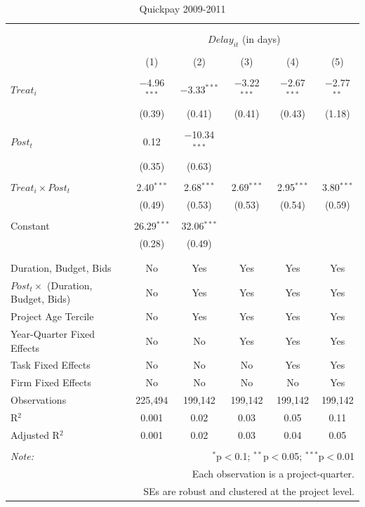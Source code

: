 \documentclass[]{article}
\begin{document}
\begin{table}[H] \centering 
  \caption{Quickpay 2009-2011} 
  \label{} 
\small 
\begin{tabular}{@{\extracolsep{-2pt}}lccccc} 
\\[-1.8ex]\hline 
\hline \\[-1.8ex] 
\\[-1.8ex] & \multicolumn{5}{c}{$Delay_{it}$ (in days)} \\ 
\\[-1.8ex] & (1) & (2) & (3) & (4) & (5)\\ 
\hline \\[-1.8ex] 
 $Treat_i$ & $-$4.96$^{***}$ & $-$3.33$^{***}$ & $-$3.22$^{***}$ & $-$2.67$^{***}$ & $-$2.77$^{**}$ \\ 
  & (0.39) & (0.41) & (0.41) & (0.43) & (1.18) \\ 
  & & & & & \\ 
 $Post_t$ & 0.12 & $-$10.34$^{***}$ &  &  &  \\ 
  & (0.35) & (0.63) &  &  &  \\ 
  & & & & & \\ 
 $Treat_i \times Post_t$ & 2.40$^{***}$ & 2.68$^{***}$ & 2.69$^{***}$ & 2.95$^{***}$ & 3.80$^{***}$ \\ 
  & (0.49) & (0.53) & (0.53) & (0.54) & (0.59) \\ 
  & & & & & \\ 
 Constant & 26.29$^{***}$ & 32.06$^{***}$ &  &  &  \\ 
  & (0.28) & (0.49) &  &  &  \\ 
  & & & & & \\ 
\hline \\[-1.8ex] 
Duration, Budget, Bids & No & Yes & Yes & Yes & Yes \\ 
$Post_t \times$  (Duration, Budget, Bids) & No & Yes & Yes & Yes & Yes \\ 
Project Age Tercile & No & Yes & Yes & Yes & Yes \\ 
Year-Quarter Fixed Effects & No & No & Yes & Yes & Yes \\ 
Task Fixed Effects & No & No & No & Yes & Yes \\ 
Firm Fixed Effects & No & No & No & No & Yes \\ 
Observations & 225,494 & 199,142 & 199,142 & 199,142 & 199,142 \\ 
R$^{2}$ & 0.001 & 0.02 & 0.03 & 0.05 & 0.11 \\ 
Adjusted R$^{2}$ & 0.001 & 0.02 & 0.03 & 0.04 & 0.05 \\ 
\hline 
\hline \\[-1.8ex] 
\textit{Note:}  & \multicolumn{5}{r}{$^{*}$p$<$0.1; $^{**}$p$<$0.05; $^{***}$p$<$0.01} \\ 
 & \multicolumn{5}{r}{Each observation is a project-quarter.} \\ 
 & \multicolumn{5}{r}{SEs are robust and clustered at the project level.} \\ 
\end{tabular} 
\end{table}
\end{document}
